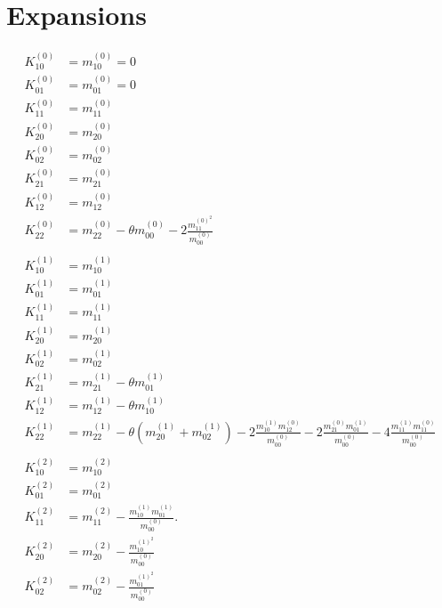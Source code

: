 \documentclass{article}
\begin{document}
  \section{Expansions}
  \begin{align}
    K_{10}^{(0)} & = m_{10}^{(0)}=0 \tag{E1}
    \\
    K_{01}^{(0)} & = m_{01}^{(0)}=0 \tag{E2}
    \\
    K_{11}^{(0)} & = m_{11}^{(0)} \tag{E3}
    \\
    K_{20}^{(0)} & = m_{20}^{(0)} \tag{E4}
    \\
    K_{02}^{(0)} & = m_{02}^{(0)} \tag{E5}
    \\
    K_{21}^{(0)} & = m_{21}^{(0)} \tag{E6}
    \\
    K_{12}^{(0)} & = m_{12}^{(0)} \tag{E7}
    \\
    K_{22}^{(0)} & = m_{22}^{(0)} - \theta m_{00}^{(0)} - 2\frac{ m_{11}^{{(0)}^2}}{m_{00}^{(0)}}\tag{E8}
  \\\nonumber&\\
    K_{10}^{(1)} & = m_{10}^{(1)} \tag{E9}
    \\
    K_{01}^{(1)} & = m_{01}^{(1)} \tag{E10}
    \\
    K_{11}^{(1)} & = m_{11}^{(1)} \tag{E11}
    \\
    K_{20}^{(1)} & = m_{20}^{(1)} \tag{E12}
    \\
    K_{02}^{(1)} & = m_{02}^{(1)} \tag{E13}
    \\
    K_{21}^{(1)} & = m_{21}^{(1)} - \theta m_{01}^{(1)} \tag{E14}
    \\
    K_{12}^{(1)} & = m_{12}^{(1)} - \theta m_{10}^{(1)} \tag{E15}
    \\
    K_{22}^{(1)} & = m_{22}^{(1)}\tag{E16}
      - \theta (m_{20}^{(1)} + m_{02}^{(1)})
      - 2\frac{ m_{10}^{(1)} m_{12}^{(0)} }{m_{00}^{(0)}}
      - 2\frac{ m_{21}^{(0)} m_{01}^{(1)} }{m_{00}^{(0)}}
      - 4\frac{ m_{11}^{(1)} m_{11}^{(0)} }{m_{00}^{(0)}}
    \\\nonumber&\\
    K_{10}^{(2)} & = m_{10}^{(2)}\tag{E17}
    \\
    K_{01}^{(2)} & = m_{01}^{(2)}\tag{E18}
    \\
    K_{11}^{(2)} & = m_{11}^{(2)} - \frac{ m_{10}^{(1)}m_{01}^{(1)}}{m_{00}^{(0)}}. \tag{E19}
    \\
    K_{20}^{(2)} & = m_{20}^{(2)} - \frac{ m_{10}^{{(1)}^2}}{m_{00}^{(0)}} \tag{E20}
    \\
    K_{02}^{(2)} & = m_{02}^{(2)} - \frac{ m_{01}^{{(1)}^2}}{m_{00}^{(0)}}\tag{E21}
  \end{align}
\end{document}
